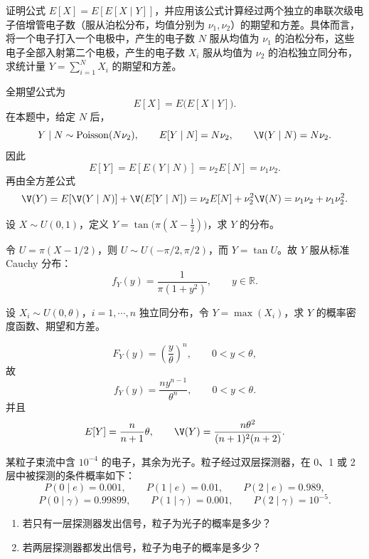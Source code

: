 \begin{question}[20 分]
证明公式 $E[X]=E[E[X\mid Y]]$，并应用该公式计算经过两个独立的串联次级电子倍增管电子数（服从泊松分布，均值分别为 $\nu_1,\nu_2$）的期望和方差。具体而言，将一个电子打入一个电极中，产生的电子数 $N$ 服从均值为 $\nu_1$ 的泊松分布，这些电子全部入射第二个电极，产生的电子数 $X_i$ 服从均值为 $\nu_2$ 的泊松独立同分布，求统计量 $Y=\sum_{i=1}^{N}X_i$ 的期望和方差。
\begin{solution}
全期望公式为
\[
E[X]=E\bigl(E[X\mid Y]\bigr).
\]
在本题中，给定 $N$ 后，
\[
Y\mid N\sim \mathrm{Poisson}(N\nu_2),
\qquad E[Y\mid N]=N\nu_2,
\qquad \V(Y\mid N)=N\nu_2.
\]
因此
\[
E[Y]=E[E(Y\mid N)]=\nu_2E[N]=\nu_1\nu_2.
\]
再由全方差公式
\[
\V(Y)=E[\V(Y\mid N)]+\V(E[Y\mid N])
=\nu_2E[N]+\nu_2^2\V(N)
=\nu_1\nu_2+\nu_1\nu_2^2.
\]
\end{solution}
\end{question}

\begin{question}[10 分]
设 $X\sim U(0,1)$，定义 $Y=\tan\bigl(\pi(X-\frac12)\bigr)$，求 $Y$ 的分布。
\begin{solution}
令 $U=\pi(X-1/2)$，则 $U\sim U(-\pi/2,\pi/2)$，而 $Y=\tan U$。故 $Y$ 服从标准 Cauchy 分布：
\[
f_Y(y)=\frac{1}{\pi(1+y^2)},\qquad y\in\mathbb R.
\]
\end{solution}
\end{question}

\begin{question}[10 分]
设 $X_i\sim U(0,\theta)$，$i=1,\cdots,n$ 独立同分布，令 $Y=\max(X_i)$，求 $Y$ 的概率密度函数、期望和方差。
\begin{solution}
\[
F_Y(y)=\left(\frac{y}{\theta}\right)^n,\qquad 0<y<\theta,
\]
故
\[
f_Y(y)=\frac{n y^{n-1}}{\theta^n},\qquad 0<y<\theta.
\]
并且
\[
E[Y]=\frac{n}{n+1}\theta,
\qquad
\V(Y)=\frac{n\theta^2}{(n+1)^2(n+2)}.
\]
\end{solution}
\end{question}

\begin{question}[20 分]
某粒子束流中含 $10^{-4}$ 的电子，其余为光子。粒子经过双层探测器，在 0、1 或 2 层中被探测的条件概率如下：
\[
P(0\mid e)=0.001,\qquad P(1\mid e)=0.01,\qquad P(2\mid e)=0.989,
\]
\[
P(0\mid \gamma)=0.99899,\qquad P(1\mid \gamma)=0.001,\qquad P(2\mid \gamma)=10^{-5}.
\]
\begin{enumerate}
\item 若只有一层探测器发出信号，粒子为光子的概率是多少？
\item 若两层探测器都发出信号，粒子为电子的概率是多少？
\end{enumerate}
\begin{solution}

\end{solution}
\end{question}

